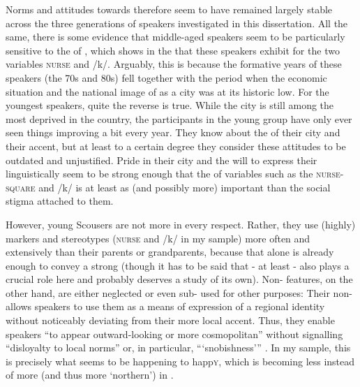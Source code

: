 Norms and attitudes towards  therefore seem to have remained largely stable across the three generations of speakers investigated in this dissertation.
All the same, there is some evidence that middle-aged speakers seem to be particularly sensitive to the  of , which shows in the  that these speakers exhibit for the two  variables \textsc{nurse} and /k/.
Arguably, this is because the formative years of these speakers (the 70s and 80s) fell together with the period when the economic situation and the national image of  as a city was at its historic low.
For the youngest speakers, quite the reverse is true.
While the city is still among the most deprived in the country, the participants in the young group have only ever seen things improving a bit every year.
They know about the  of their city and their accent, but at least to a certain degree they consider these attitudes to be outdated and unjustified.
Pride in their city and the will to express their  linguistically seem to be strong enough that the   of variables such as the \textsc{nurse}-\textsc{square}  and /k/  is at least as (and possibly more) important than the social stigma attached to them.

However, young Scousers are not more  in every respect.
Rather, they use (highly)  markers and stereotypes (\textsc{nurse} and /k/  in my sample) more often and extensively than their parents or grandparents, because that alone is already enough to convey a strong  (though it has to be said that  -  at least - also plays a crucial role here and probably deserves a study of its own).
Non- features, on the other hand, are either neglected or even sub- used for other purposes: Their non- allows speakers to use them as a means of expression of a regional identity without noticeably deviating from their more local accent.
Thus, they enable speakers ``to appear outward-looking or more cosmopolitan'' without signalling ``disloyalty to local norms'' or, in particular, ``{}`snobishness'{}'' \parencite[13--14]{foulkesdocherty1999a}.
In my sample, this is precisely what seems to be happening to happ\textsc{y}, which is becoming less instead of more  (and thus more `northern') in .

